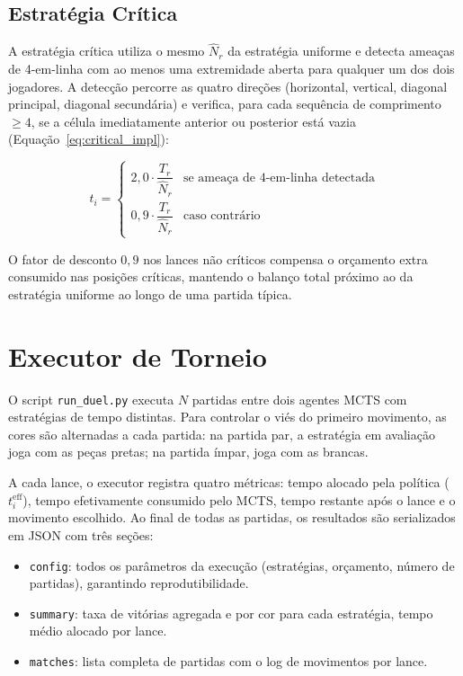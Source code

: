 \documentclass[cic,tc]{iiufrgs}
\begin{document}
\subsection{Estratégia Crítica}
\label{sec:impl_critical}

A estratégia crítica utiliza o mesmo $\hat{N}_r$ da estratégia uniforme e detecta ameaças de 4-em-linha com ao menos uma extremidade aberta para qualquer um dos dois jogadores. A detecção percorre as quatro direções (horizontal, vertical, diagonal principal, diagonal secundária) e verifica, para cada sequência de comprimento $\geq 4$, se a célula imediatamente anterior ou posterior está vazia (Equação~\ref{eq:critical_impl}):

\begin{equation}
    t_i =
    \begin{cases}
        2{,}0 \cdot \dfrac{T_r}{\hat{N}_r} & \text{se ameaça de 4-em-linha detectada} \\[6pt]
        0{,}9 \cdot \dfrac{T_r}{\hat{N}_r} & \text{caso contrário}
    \end{cases}
\label{eq:critical_impl}
\end{equation}

O fator de desconto $0{,}9$ nos lances não críticos compensa o orçamento extra consumido nas posições críticas, mantendo o balanço total próximo ao da estratégia uniforme ao longo de uma partida típica.

\section{Executor de Torneio}
\label{sec:impl_runner}

O script \texttt{run\_duel.py} executa $N$ partidas entre dois agentes MCTS com estratégias de tempo distintas. Para controlar o viés do primeiro movimento, as cores são alternadas a cada partida: na partida par, a estratégia em avaliação joga com as peças pretas; na partida ímpar, joga com as brancas.

A cada lance, o executor registra quatro métricas: tempo alocado pela política ($t_i^{\text{eff}}$), tempo efetivamente consumido pelo MCTS, tempo restante após o lance e o movimento escolhido. Ao final de todas as partidas, os resultados são serializados em JSON com três seções:

\begin{itemize}
    \item \texttt{config}: todos os parâmetros da execução (estratégias, orçamento, número de partidas), garantindo reprodutibilidade.
    \item \texttt{summary}: taxa de vitórias agregada e por cor para cada estratégia, tempo médio alocado por lance.
    \item \texttt{matches}: lista completa de partidas com o log de movimentos por lance.
\end{itemize}
\end{document}

